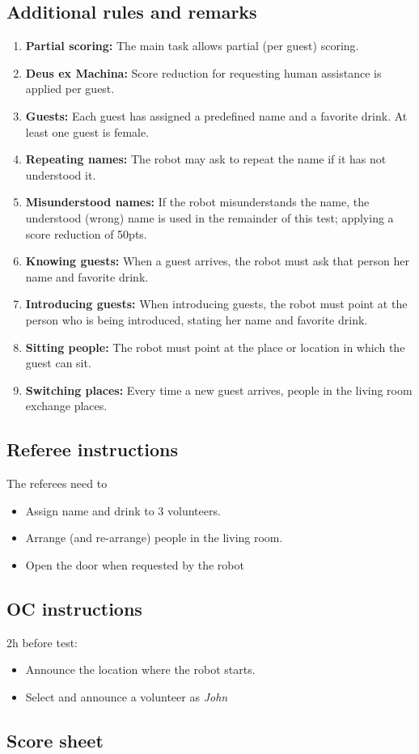 \subsection*{Additional rules and remarks}
\begin{enumerate}[nosep]
	\item \textbf{Partial scoring:} The main task allows partial (per guest) scoring.
	
	\item \textbf{Deus ex Machina:} Score reduction for requesting human assistance is applied per guest.

	\item \textbf{Guests:} Each guest has assigned a predefined name and a favorite drink. At least one guest is female.

	\item \textbf{Repeating names:} The robot may ask to repeat the name if it has not understood it.

	\item \textbf{Misunderstood names:} If the robot misunderstands the name, the understood (wrong) name is used in the remainder of this test; applying a score reduction of 50pts.

	\item \textbf{Knowing guests:} When a guest arrives, the robot must ask that person her name and favorite drink.

	\item \textbf{Introducing guests:} When introducing guests, the robot must point at the person who is being introduced, stating her name and favorite drink.

	\item \textbf{Sitting people:} The robot must point at the place or location in which the guest can sit.

	\item \textbf{Switching places:} Every time a new guest arrives, people in the living room exchange places.
\end{enumerate}


\subsection*{Referee instructions}

The referees need to
\begin{itemize}
	\item Assign name and drink to 3 volunteers.
	\item Arrange (and re-arrange) people in the living room.
	\item Open the door when requested by the robot
\end{itemize}

\subsection*{OC instructions}

2h before test:
\begin{itemize}
	\item Announce the location where the robot starts.
	\item Select and announce a volunteer as \emph{John}
\end{itemize}

\subsection*{Score sheet}

